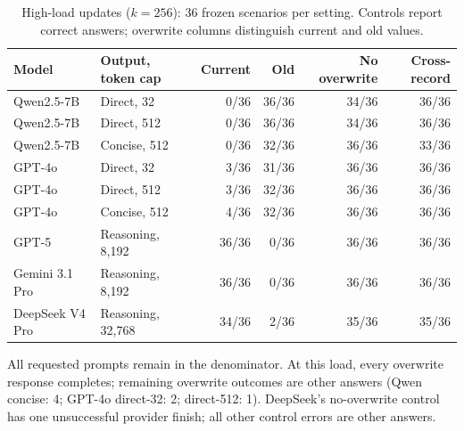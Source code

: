 \begin{table}[htbp]
\centering\small
\setlength{\tabcolsep}{3pt}
\caption{High-load updates ($k=256$): 36 frozen scenarios per setting.
Controls report correct answers; overwrite columns distinguish current and old values.}
\label{tab:highload-compact}
\begin{tabular}{@{}llrrrr@{}}
\toprule
Model & Output, token cap & Current & Old & No overwrite & Cross-record \\
\midrule
Qwen2.5-7B & Direct, 32 & 0/36 & 36/36 & 34/36 & 36/36 \\
Qwen2.5-7B & Direct, 512 & 0/36 & 36/36 & 34/36 & 36/36 \\
Qwen2.5-7B & Concise, 512 & 0/36 & 32/36 & 36/36 & 33/36 \\
GPT-4o & Direct, 32 & 3/36 & 31/36 & 36/36 & 36/36 \\
GPT-4o & Direct, 512 & 3/36 & 32/36 & 36/36 & 36/36 \\
GPT-4o & Concise, 512 & 4/36 & 32/36 & 36/36 & 36/36 \\
GPT-5 & Reasoning, 8,192 & 36/36 & 0/36 & 36/36 & 36/36 \\
Gemini 3.1 Pro & Reasoning, 8,192 & 36/36 & 0/36 & 36/36 & 36/36 \\
DeepSeek V4 Pro & Reasoning, 32,768 & 34/36 & 2/36 & 35/36 & 35/36 \\
\bottomrule
\end{tabular}
\par\smallskip
\parbox{\linewidth}{\footnotesize All requested prompts remain in the denominator.
At this load, every overwrite response completes; remaining overwrite outcomes
are other answers (Qwen concise: 4; GPT-4o direct-32: 2; direct-512: 1).
DeepSeek's no-overwrite control has one unsuccessful provider finish;
all other control errors are other answers.}
\end{table}
